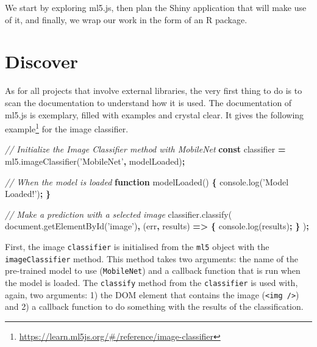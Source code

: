 \documentclass[10pt,]{krantz}
\makeatletter
\newenvironment{Shaded}{\begin{snugshade}}{\end{snugshade}}
\newcommand{\AttributeTok}[1]{\textcolor[rgb]{0.61,0.61,0.61}{#1}}
\newcommand{\CommentTok}[1]{\textcolor[rgb]{0.37,0.37,0.37}{\textit{#1}}}
\newcommand{\KeywordTok}[1]{\textcolor[rgb]{0.27,0.27,0.27}{\textbf{#1}}}
\newcommand{\NormalTok}[1]{#1}
\newcommand{\OperatorTok}[1]{\textcolor[rgb]{0.43,0.43,0.43}{\textbf{#1}}}
\newcommand{\StringTok}[1]{\textcolor[rgb]{0.5,0.5,0.5}{#1}}
\newcommand{\VariableTok}[1]{\textcolor[rgb]{0,0,0}{#1}}
\renewcommand{\href}[2]{#2\footnote{\url{#1}}}
\newenvironment{kframe}{%
\medskip{}
\setlength{\fboxsep}{.8em}
 \def\at@end@of@kframe{}%
 \ifinner\ifhmode%
  \def\at@end@of@kframe{\end{minipage}}%
  \begin{minipage}{\columnwidth}%
 \fi\fi%
 \def\FrameCommand##1{\hskip\@totalleftmargin \hskip-\fboxsep
 \colorbox{shadecolor}{##1}\hskip-\fboxsep
     \hskip-\linewidth \hskip-\@totalleftmargin \hskip\columnwidth}%
 \MakeFramed {\advance\hsize-\width
   \@totalleftmargin\z@ \linewidth\hsize
   \@setminipage}}%
 {\par\unskip\endMakeFramed%
 \at@end@of@kframe}
\renewenvironment{Shaded}{\begin{kframe}}{\end{kframe}}
\makeatother
\begin{document}
We start by exploring ml5.js, then plan the Shiny application that will make use of it, and finally, we wrap our work in the form of an R package.

\hypertarget{shiny-complete-discover}{%
\section{Discover}\label{shiny-complete-discover}}

As for all projects that involve external libraries, the very first thing to do is to scan the documentation to understand how it is used. The documentation of ml5.js is exemplary, filled with examples and crystal clear. \href{https://learn.ml5js.org/\#/reference/image-classifier}{It gives the following example} for the image classifier.

\begin{Shaded}
\begin{Highlighting}[]
\CommentTok{// Initialize the Image Classifier method with MobileNet}
\KeywordTok{const}\NormalTok{ classifier }\OperatorTok{=} \VariableTok{ml5}\NormalTok{.}\AttributeTok{imageClassifier}\NormalTok{(}\StringTok{'MobileNet'}\OperatorTok{,}\NormalTok{ modelLoaded)}\OperatorTok{;}

\CommentTok{// When the model is loaded}
\KeywordTok{function} \AttributeTok{modelLoaded}\NormalTok{() }\OperatorTok{\{}
  \VariableTok{console}\NormalTok{.}\AttributeTok{log}\NormalTok{(}\StringTok{'Model Loaded!'}\NormalTok{)}\OperatorTok{;}
\OperatorTok{\}}

\CommentTok{// Make a prediction with a selected image}
\VariableTok{classifier}\NormalTok{.}\AttributeTok{classify}\NormalTok{(}
  \VariableTok{document}\NormalTok{.}\AttributeTok{getElementById}\NormalTok{(}\StringTok{'image'}\NormalTok{)}\OperatorTok{,}\NormalTok{ (err}\OperatorTok{,}\NormalTok{ results) }\KeywordTok{=>} \OperatorTok{\{}
    \VariableTok{console}\NormalTok{.}\AttributeTok{log}\NormalTok{(results)}\OperatorTok{;}
  \OperatorTok{\}}
\NormalTok{)}\OperatorTok{;}
\end{Highlighting}
\end{Shaded}

First, the image \texttt{classifier} is initialised from the \texttt{ml5} object with the \texttt{imageClassifier} method. This method takes two arguments: the name of the pre-trained model to use (\texttt{MobileNet}) and a callback function that is run when the model is loaded. The \texttt{classify} method from the \texttt{classifier} is used with, again, two arguments: 1) the DOM element that contains the image (\texttt{\textless{}img\ /\textgreater{}}) and 2) a callback function to do something with the results of the classification.
\end{document}
